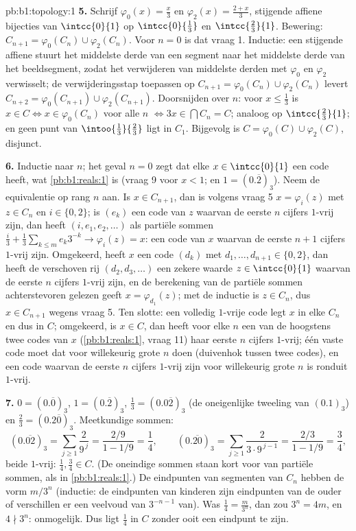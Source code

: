 \begin{solution}{pb:b1:topology:1}
\textbf{5.} Schrijf $\varphi_0(x) = \frac x3$ en $\varphi_2(x) = \frac{2
+ x}{3}$, stijgende affiene bijecties van $\intcc{0}{1}$ op
$\intcc{0}{\frac13}$ en $\intcc{\frac23}{1}$. Bewering: $C_{n+1} =
\varphi_0(C_n) \cup \varphi_2(C_n)$. Voor $n = 0$ is dat vraag 1.
Inductie: een stijgende affiene  stuurt het middelste derde van
een segment naar het middelste derde van het beeldsegment, zodat het
verwijderen van middelste derden met $\varphi_0$ en $\varphi_2$
verwisselt; de verwijderingsstap toepassen op $C_{n+1} = \varphi_0(C_n)
\cup \varphi_2(C_n)$ levert $C_{n+2} = \varphi_0(C_{n+1}) \cup
\varphi_2(C_{n+1})$. Doorsnijden over $n$: voor $x \leq \frac13$ is $x
\in C \iff x \in \varphi_0(C_n)$ voor alle $n$ $\iff 3x \in \bigcap C_n =
C$; analoog op $\intcc{\frac23}{1}$; en geen punt van
$\intoo{\frac13}{\frac23}$ ligt in $C_1$. Bijgevolg is $C = \varphi_0(C)
\cup \varphi_2(C)$, disjunct.

\textbf{6.} Inductie naar $n$; het geval $n = 0$ zegt dat elke $x \in
\intcc{0}{1}$ een code heeft, wat \cref{pb:b1:reals:1} is (vraag 9 voor
$x < 1$; en $1 = (0.\overline 2)_3$). Neem de equivalentie op rang $n$
aan. Is $x \in C_{n+1}$, dan is volgens vraag 5 $x = \varphi_i(z)$ met $z
\in C_n$ en $i \in \{0, 2\}$; is $(e_k)$ een code van $z$ waarvan de
eerste $n$ cijfers $1$-vrij zijn, dan heeft $(i, e_1, e_2, \dots)$ als
partiële sommen $\frac i3 + \frac13\sum_{k\leq m} e_k 3^{-k} \to
\varphi_i(z) = x$: een code van $x$ waarvan de eerste $n + 1$ cijfers
$1$-vrij zijn. Omgekeerd, heeft $x$ een code $(d_k)$ met $d_1, \dots,
d_{n+1} \in \{0, 2\}$, dan heeft de verschoven rij $(d_2, d_3, \dots)$
een zekere waarde $z \in \intcc{0}{1}$ waarvan de eerste $n$ cijfers
$1$-vrij zijn, en de berekening van de partiële sommen achterstevoren
gelezen geeft $x = \varphi_{d_1}(z)$; met de inductie is $z \in C_n$, dus
$x \in C_{n+1}$ wegens vraag 5. Ten slotte: een volledig $1$-vrije code
legt $x$ in elke $C_n$ en dus in $C$; omgekeerd, is $x \in C$, dan heeft
voor elke $n$ een van de hoogstens twee codes van $x$
(\cref{pb:b1:reals:1}, vraag 11) haar eerste $n$ cijfers $1$-vrij; één
vaste code moet dat voor willekeurig grote $n$ doen (duivenhok tussen
twee codes), en een code waarvan de eerste $n$ cijfers $1$-vrij zijn voor
willekeurig grote $n$ is ronduit $1$-vrij.

\textbf{7.} $0 = (0.\overline 0)_3$, $1 = (0.\overline 2)_3$, $\frac13 =
(0.0\overline{2})_3$ (de oneigenlijke tweeling van $(0.1)_3$) en
$\frac23 = (0.2\overline{0})_3$. Meetkundige sommen:
\[
(0.\overline{02})_3 = \sum_{j\geq1} \frac{2}{9^{\,j}}
= \frac{2/9}{1 - 1/9} = \frac14 ,
\qquad
(0.\overline{20})_3 = \sum_{j\geq1} \frac{2}{3\cdot 9^{\,j-1}}
= \frac{2/3}{1 - 1/9} = \frac34 ,
\]
beide $1$-vrij: $\frac14, \frac34 \in C$. (De oneindige sommen staan kort
voor  van partiële sommen, als in \cref{pb:b1:reals:1}.) De
eindpunten van segmenten van $C_n$ hebben de vorm $m/3^n$ (inductie: de
eindpunten van kinderen zijn eindpunten van de ouder of verschillen er
een veelvoud van $3^{-n-1}$ van). Was $\frac14 = \frac{m}{3^n}$, dan zou
$3^n = 4m$, en $4 \nmid 3^n$: onmogelijk. Dus ligt $\frac14$ in $C$
zonder ooit een eindpunt te zijn.


\end{solution}
